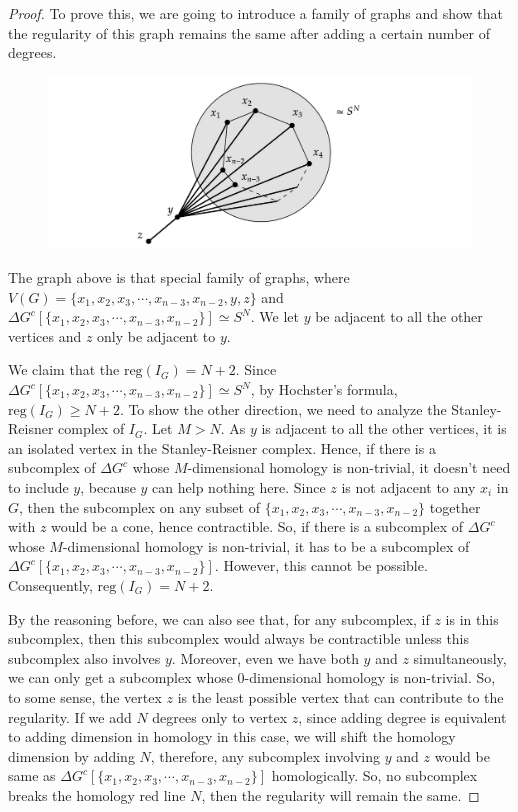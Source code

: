 \documentclass[dvipsnames,10pt]{article}
\begin{document}
\begin{proof}
To prove this, we are going to introduce a family of graphs and show that the regularity of this graph remains the same after adding a certain number of degrees.  
  \begin{figure}[h]
      \centering
      \includegraphics[width=0.8\linewidth]{diagram-20250828.png}
  \end{figure}  

The graph above is that special family of graphs, where $V(G)=\{x_1,x_2,x_3,\cdots,x_{n-3},x_{n-2},y,z\}$ and $\Delta G^c[\{x_1,x_2,x_3,\cdots,x_{n-3},x_{n-2}\}]\simeq S^N$. We let $y$ be adjacent to all the other vertices and $z$ only be adjacent to $y$.

We claim that the $\mathrm{reg}(I_G)=N+2$. Since  $\Delta G^c[\{x_1,x_2,x_3,\cdots,x_{n-3},x_{n-2}\}]\simeq S^N$, by Hochster's formula, $\mathrm{reg}(I_G)\geq N+2$. To show the other direction, we need to analyze the Stanley-Reisner complex of $I_G$. Let $M>N$. As $y$ is adjacent to all the other vertices, it is an isolated vertex in the Stanley-Reisner complex.  Hence, if there is a subcomplex of $\Delta G^c$ whose $M$-dimensional homology is non-trivial, it doesn't need to include $y$, because $y$ can help nothing here. Since $z$ is not adjacent to any $x_i$ in $G$, then the subcomplex on any subset of $\{x_1,x_2,x_3,\cdots,x_{n-3},x_{n-2}\}$ together with $z$ would be a cone, hence contractible. So, if there is a subcomplex of $\Delta G^c$ whose $M$-dimensional homology is non-trivial, it has to be a subcomplex of $\Delta G^c[\{x_1,x_2,x_3,\cdots,x_{n-3},x_{n-2}\}]$. However, this cannot be possible. Consequently, $\mathrm{reg}(I_G)=N+2$.

By the reasoning before, we can also see that, for any subcomplex, if $z$ is in this subcomplex, then this subcomplex would always be contractible unless this subcomplex also involves $y$. Moreover, even we have both $y$ and $z$ simultaneously, we can only get a subcomplex whose $0$-dimensional homology is non-trivial. So, to some sense, the vertex $z$ is the least possible vertex that can contribute to the regularity. If we add $N$ degrees only to vertex $z$, since adding degree is equivalent to adding dimension in homology in this case, we will shift the homology dimension by adding $N$, therefore, any subcomplex involving $y$ and $z$ would be same as $\Delta G^c[\{x_1,x_2,x_3,\cdots,x_{n-3},x_{n-2}\}]$ homologically. So, no subcomplex breaks the homology red line $N$, then the regularity will remain the same.
\end{proof}
\end{document}
